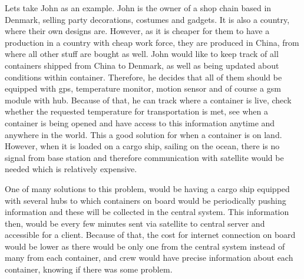 Lets take John as an example. John is the owner of a shop chain based in Denmark, selling party decorations, costumes and gadgets. It is also a country, where their own designs are. However, as it is cheaper for them to have a production in a country with cheap work force, they are produced in China, from where all other stuff are bought as well. John would like to keep track of all containers shipped from China to Denmark, as well as being updated about conditions within container. Therefore, he decides that all of them should be equipped with \acrshort{gps}, temperature monitor, motion sensor and of course a \acrshort{gsm} module with hub. Because of that, he can track where a container is live, check whether the requested temperature for transportation is met, see when a container is being opened and have access to this information anytime and anywhere in the world. This a good solution for when a container is on land. However, when it is loaded on a cargo ship, sailing on the ocean, there is no signal from base station and therefore communication with satellite would be needed which is relatively expensive\footnotemark.
% 

One of many solutions to this problem, would be having a cargo ship equipped with several hubs to which containers on board would be periodically pushing information and these will be collected in the central system. This information then, would be every few minutes sent via satellite to central server and accessible for a client. Because of that, the cost for internet connection on board would be lower as there would be only one from the central system instead of many from each container, and crew would have precise information about each container, knowing if there was some problem.